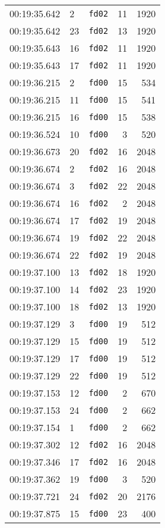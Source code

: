 \documentclass{article}
\begin{document}
\begin{longtable}{lllrr}
00:19:35.642 & 2 & \texttt{fd02} & 11 & 1920 \\
00:19:35.642 & 23 & \texttt{fd02} & 13 & 1920 \\
00:19:35.643 & 16 & \texttt{fd02} & 11 & 1920 \\
00:19:35.643 & 17 & \texttt{fd02} & 11 & 1920 \\
00:19:36.215 & 2 & \texttt{fd00} & 15 & 534 \\
00:19:36.215 & 11 & \texttt{fd00} & 15 & 541 \\
00:19:36.215 & 16 & \texttt{fd00} & 15 & 538 \\
00:19:36.524 & 10 & \texttt{fd00} & 3 & 520 \\
00:19:36.673 & 20 & \texttt{fd02} & 16 & 2048 \\
00:19:36.674 & 2 & \texttt{fd02} & 16 & 2048 \\
00:19:36.674 & 3 & \texttt{fd02} & 22 & 2048 \\
00:19:36.674 & 16 & \texttt{fd02} & 2 & 2048 \\
00:19:36.674 & 17 & \texttt{fd02} & 19 & 2048 \\
00:19:36.674 & 19 & \texttt{fd02} & 22 & 2048 \\
00:19:36.674 & 22 & \texttt{fd02} & 19 & 2048 \\
00:19:37.100 & 13 & \texttt{fd02} & 18 & 1920 \\
00:19:37.100 & 14 & \texttt{fd02} & 23 & 1920 \\
00:19:37.100 & 18 & \texttt{fd02} & 13 & 1920 \\
00:19:37.129 & 3 & \texttt{fd00} & 19 & 512 \\
00:19:37.129 & 15 & \texttt{fd00} & 19 & 512 \\
00:19:37.129 & 17 & \texttt{fd00} & 19 & 512 \\
00:19:37.129 & 22 & \texttt{fd00} & 19 & 512 \\
00:19:37.153 & 12 & \texttt{fd00} & 2 & 670 \\
00:19:37.153 & 24 & \texttt{fd00} & 2 & 662 \\
00:19:37.154 & 1 & \texttt{fd00} & 2 & 662 \\
00:19:37.302 & 12 & \texttt{fd02} & 16 & 2048 \\
00:19:37.346 & 17 & \texttt{fd02} & 16 & 2048 \\
00:19:37.362 & 19 & \texttt{fd00} & 3 & 520 \\
00:19:37.721 & 24 & \texttt{fd02} & 20 & 2176 \\
00:19:37.875 & 15 & \texttt{fd00} & 23 & 400 \\

\end{longtable}
\end{document}
